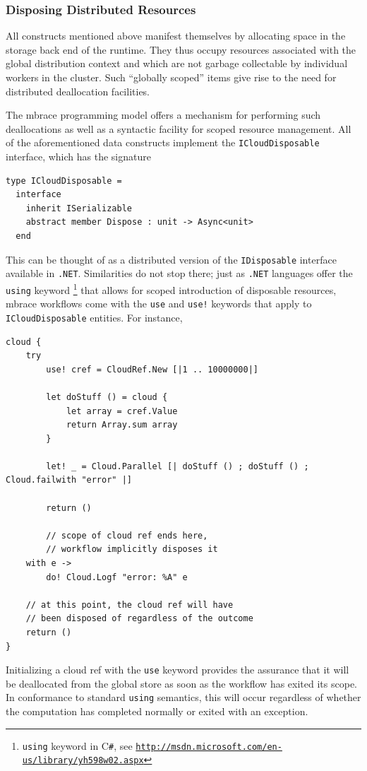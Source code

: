 \documentclass[9pt,a4paper]{article}
\newcommand{\mbrace}{mbrace}
\newcommand{\csharp}{C\texttt \#}
\newcommand{\dotnet}{\texttt{\hbox{.}NET}}
\newcommand{\samehref}[1]{\href{#1}{\texttt{#1}}}
\begin{document}
\subsubsection*{Disposing Distributed Resources}

All constructs mentioned above manifest themselves by allocating space in the
storage back end of the runtime. They thus occupy resources associated with
the global distribution context and which are not garbage collectable by
individual workers in the cluster. Such ``globally scoped'' items give rise
to the need for distributed deallocation facilities.

The \mbrace{} programming model offers a mechanism for performing such deallocations
as well as a syntactic facility for scoped resource management. 
All of the aforementioned data constructs implement the \texttt{ICloudDisposable}
interface, which has the signature
\begin{lstlisting}
type ICloudDisposable =
  interface
    inherit ISerializable
    abstract member Dispose : unit -> Async<unit>
  end
\end{lstlisting}
This can be thought of as a distributed version of the \texttt{IDisposable}
interface available in \dotnet. Similarities do not stop there; just as
\dotnet{} languages offer the \texttt{using} keyword%
\footnote{\texttt{using} keyword in \csharp, see 
\samehref{http://msdn.microsoft.com/en-us/library/yh598w02.aspx}} 
that allows for scoped introduction of disposable resources, 
\mbrace{} workflows come with the \texttt{use} and \texttt{use!} keywords that 
apply to \texttt{ICloudDisposable} entities. For instance,
\begin{lstlisting}
cloud {
    try
        use! cref = CloudRef.New [|1 .. 10000000|]

        let doStuff () = cloud {
            let array = cref.Value
            return Array.sum array
        }

        let! _ = Cloud.Parallel [| doStuff () ; doStuff () ; Cloud.failwith "error" |]

        return ()

        // scope of cloud ref ends here, 
        // workflow implicitly disposes it
    with e ->
        do! Cloud.Logf "error: %A" e
        
    // at this point, the cloud ref will have 
    // been disposed of regardless of the outcome
    return ()
}
\end{lstlisting}
Initializing a cloud ref with the \texttt{use} keyword provides the assurance 
that it will be deallocated from the global store as soon as the workflow has 
exited its scope. In conformance to standard \texttt{using} semantics,
this will occur regardless of whether the computation has completed normally
or exited with an exception.
\end{document}
